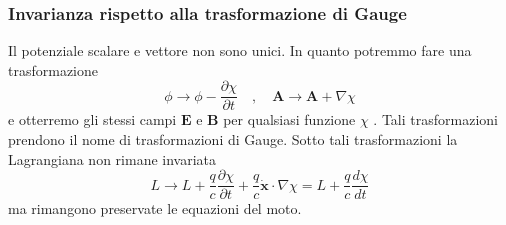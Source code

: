 \subsubsection{Invarianza rispetto alla trasformazione di Gauge}

Il potenziale scalare e vettore non sono unici. In quanto potremmo fare una trasformazione 
\begin{equation}
\phi \rightarrow \phi-\frac{\partial \chi}{\partial t} \quad, \quad \mathbf{A} \rightarrow \mathbf{A}+\nabla \chi
\end{equation}
e otterremo gli stessi campi $\bm{E}$ e $\bm{B}$ per qualsiasi funzione $\chi$
. Tali trasformazioni prendono il nome di trasformazioni di Gauge. Sotto tali trasformazioni la Lagrangiana non rimane invariata 
\begin{equation}
L \rightarrow L+ \frac{q}{c} \frac{\partial \chi}{\partial t}+ \frac{q}{c} \dot{\mathbf{x}} \cdot \nabla \chi=L+ \frac{q}{c}\frac{d \chi}{d t}
\end{equation}
ma rimangono preservate le equazioni del moto.


